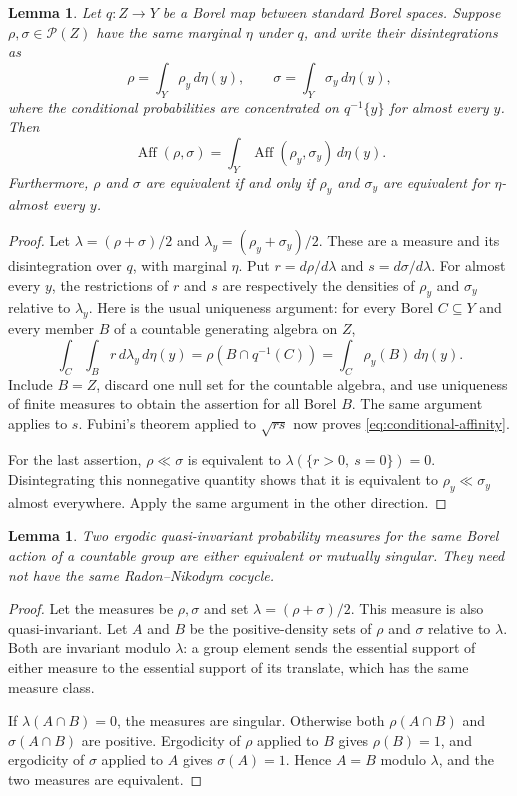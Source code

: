 \documentclass[11pt]{article}
\newtheorem{lemma}[theorem]{Lemma}
\theoremstyle{definition}
\newcommand{\Prob}{\mathcal P}
\newcommand{\Aff}{\operatorname{Aff}}
\begin{document}
\begin{lemma}\label{lem:affinity-disintegration}
Let $q:Z\to Y$ be a Borel map between standard Borel spaces. Suppose
$\rho,\sigma\in\Prob(Z)$ have the same marginal $\eta$ under $q$, and
write their disintegrations as
\[
 \rho=\int_Y\rho_y\,d\eta(y),\qquad
 \sigma=\int_Y\sigma_y\,d\eta(y),
\]
where the conditional probabilities are concentrated on $q^{-1}\{y\}$
for almost every $y$. Then
\begin{equation}\label{eq:conditional-affinity}
 \Aff(\rho,\sigma)
   =\int_Y\Aff(\rho_y,\sigma_y)\,d\eta(y).
\end{equation}
Furthermore, $\rho$ and $\sigma$ are equivalent if and only if
$\rho_y$ and $\sigma_y$ are equivalent for $\eta$-almost every $y$.
\end{lemma}

\begin{proof}
Let $\lambda=(\rho+\sigma)/2$ and
$\lambda_y=(\rho_y+\sigma_y)/2$. These are a measure and its
disintegration over $q$, with marginal $\eta$. Put
$r=d\rho/d\lambda$ and $s=d\sigma/d\lambda$.
For almost every $y$, the restrictions of $r$ and $s$ are respectively
the densities of $\rho_y$ and $\sigma_y$ relative to $\lambda_y$.
Here is the usual uniqueness argument: for every Borel $C\subseteq Y$
and every member $B$ of a countable generating algebra on $Z$,
\[
 \int_C\int_B r\,d\lambda_y\,d\eta(y)
 =\rho(B\cap q^{-1}(C))
 =\int_C\rho_y(B)\,d\eta(y).
\]
Include $B=Z$, discard one null set for the countable algebra, and
use uniqueness of finite measures to obtain the assertion for all
Borel $B$. The same argument applies to $s$.
Fubini's theorem applied to $\sqrt{rs}$ now proves
\eqref{eq:conditional-affinity}.

For the last assertion, $\rho\ll\sigma$ is equivalent to
$\lambda(\{r>0,\ s=0\})=0$. Disintegrating this nonnegative quantity
shows that it is equivalent to $\rho_y\ll\sigma_y$ almost everywhere.
Apply the same argument in the other direction.
\end{proof}

\begin{lemma}\label{lem:ergodic-dichotomy}
Two ergodic quasi-invariant probability measures for the same Borel
action of a countable group are either equivalent or mutually singular.
They need not have the same Radon--Nikodym cocycle.
\end{lemma}

\begin{proof}
Let the measures be $\rho,\sigma$ and set
$\lambda=(\rho+\sigma)/2$. This measure is also quasi-invariant.
Let $A$ and $B$ be the positive-density sets of $\rho$ and $\sigma$
relative to $\lambda$. Both are invariant modulo $\lambda$: a group
element sends the essential support of either measure to the
essential support of its translate, which has the same measure class.

If $\lambda(A\cap B)=0$, the measures are singular. Otherwise both
$\rho(A\cap B)$ and $\sigma(A\cap B)$ are positive. Ergodicity of
$\rho$ applied to $B$ gives $\rho(B)=1$, and ergodicity of $\sigma$
applied to $A$ gives $\sigma(A)=1$. Hence $A=B$ modulo $\lambda$,
and the two measures are equivalent.
\end{proof}
\end{document}
